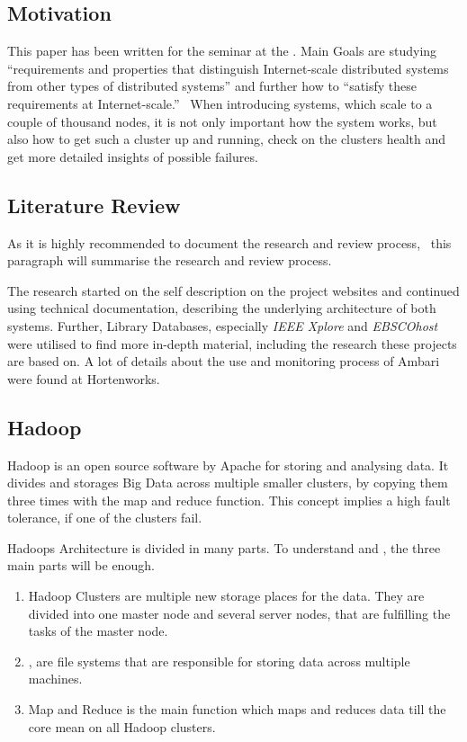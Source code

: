 \subsection{Motivation}
This paper has been written for the seminar \isdslong at the \tum. Main Goals are studying ``requirements and properties that distinguish Internet-scale distributed systems from other types of distributed systems'' and further how to ``satisfy these requirements at Internet-scale.''~\cite{SeminarInfo} 
When introducing systems, which scale to a couple of thousand nodes, it is not only important how the system works, but also how to get such a cluster up and running, check on the clusters health and get more detailed insights of possible failures.

\subsection{Literature Review}
As it is highly recommended to document the research and review process,~\cite{brocke09} this paragraph will summarise the research and review process.

The research started on the self description on the project websites and continued using technical documentation, describing the underlying architecture of both systems.
Further, Library Databases, especially \emph{IEEE Xplore} and \emph{EBSCOhost} were utilised to find more in-depth material, including the research these projects are based on. A lot of details about the use and monitoring process of Ambari were found at Hortenworks.
	
\subsection{Hadoop}
\label{subsec:Hadoop}
Hadoop is an open source software by Apache for storing and analysing data.\cite{Dagli2014} It divides and storages Big Data across multiple smaller clusters, by copying them three times with the map and reduce function. This concept implies a high fault tolerance, if one of the clusters fail.\cite{Dagli2014}

Hadoops Architecture is divided in many parts. To understand \amb and \chuk, the three main parts will be enough.\cite{Dagli2014}
  \begin{enumerate}
  	\item Hadoop Clusters are multiple new storage places for the data. They are divided into one master node and several server nodes, that are fulfilling the tasks of the master node.\cite{Dagli2014}
  	\item \hdfs, are file systems that are responsible for storing data across multiple machines.\cite{Dagli2014}
  	\item Map and Reduce is the main function which maps and reduces data till the core mean on all Hadoop clusters.\cite{Dagli2014}
  \end{enumerate}


